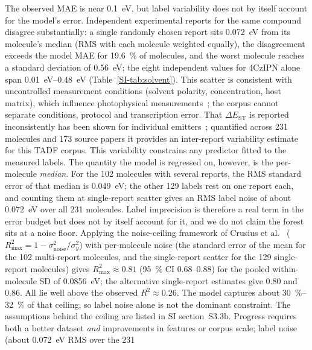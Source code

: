 The observed MAE is near \qty{0.1}{\electronvolt}, but label variability does
not by itself account for the model's error.
Independent experimental reports for the same compound disagree
substantially: a single randomly chosen report sits \qty{0.072}{\electronvolt} from its
molecule's median (RMS with each molecule weighted equally), the disagreement exceeds the
model MAE for \qty{19.6}{\percent} of molecules, and the worst molecule reaches a standard
deviation of \qty{0.56}{\electronvolt}; the eight independent values for 4CzIPN alone span
\qtyrange{0.01}{0.48}{\electronvolt} (Table~\ref{SI-tab:solvent}). This scatter is consistent with uncontrolled measurement conditions (solvent polarity, concentration, host matrix), which influence photophysical measurements~\cite{Dang2025}; the corpus cannot separate conditions, protocol and transcription error. That $\Delta E_\text{ST}$
is reported inconsistently has been shown for individual emitters~\cite{Shuaib2026};
quantified across \num{231} molecules and \num{173} source papers it provides
an inter-report variability estimate for this TADF corpus. This variability
constrains any predictor fitted to the measured labels.
The quantity the model is regressed on, however, is the per-molecule \emph{median}.
For the \num{102} molecules with several reports, the RMS standard error of that median
is \qty{0.049}{\electronvolt}; the other \num{129} labels rest on one report each, and
counting them at single-report scatter gives an RMS label noise of about
\qty{0.072}{\electronvolt} over all \num{231} molecules. Label imprecision is therefore
a real term in the error budget but does not by itself account for it, and we do not
claim the forest sits at a noise floor.
Applying the noise-ceiling framework of Crusius et al.~\cite{Crusius2025}
($R^2_\text{max} = 1 - \sigma^2_\text{noise}/\sigma^2_y$) with per-molecule noise
(the standard error of the mean for the \num{102} multi-report molecules, and the
single-report scatter for the \num{129} single-report molecules) gives
$R^2_\text{max} \approx 0.81$ (\qty{95}{\percent} CI \numrange{0.68}{0.88}) for the
pooled within-molecule SD of \qty{0.0856}{\electronvolt}; the alternative single-report
estimates give \num{0.80} and \num{0.86}. All lie well above the observed $R^2 \approx 0.26$.
The model captures about \qtyrange{30}{32}{\percent} of that ceiling, so label noise alone is not the dominant
constraint. The assumptions behind the ceiling are listed in SI section~S3.3b.
Progress requires both a better dataset \emph{and} improvements in features or
corpus scale; label noise (about \qty{0.072}{\electronvolt} RMS over the \num{231}
